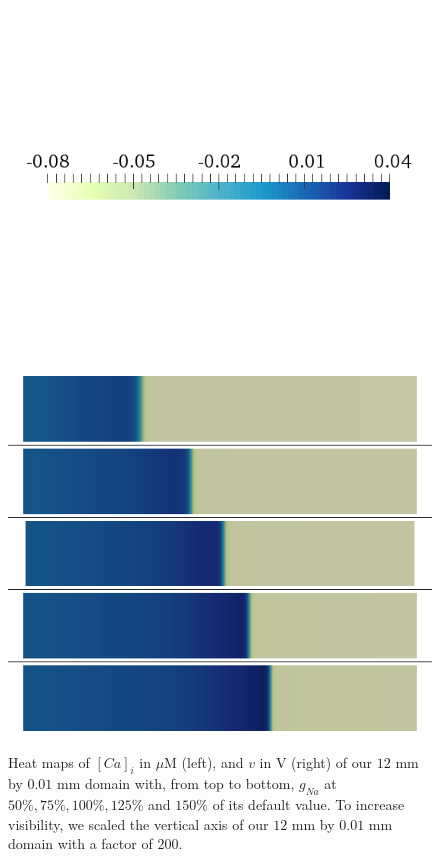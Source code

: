 \documentclass[12pt,a4paper]{article}
\begin{document}
\begin{figure}
\begin{minipage}{0.5\textwidth}
\includegraphics[trim=0cm 7cm 0cm 6cm, clip=true, width=1\linewidth]{legend_v2}
\includegraphics[trim=0cm 0cm 0cm 0cm, clip=true, width=1\linewidth]{v_gna}
    \end{minipage}
    \caption{Heat maps of $[Ca]_i$ in $\mu$M (left), and $v$ in V (right) of our $12$ mm by $0.01$ mm domain with, from top to bottom, $g_{Na}$ at $50\%, 75\%, 100\%, 125\%$ and $150\%$ of its default value. To increase visibility, we scaled the vertical axis of our $12$ mm by $0.01$ mm domain with a factor of $200$.}
    \label{fig:1a}
\end{figure}
\end{document}
